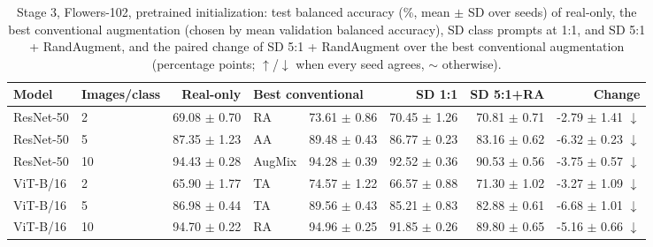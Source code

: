\begin{table}[H]
\centering
\small
\setlength{\tabcolsep}{4pt}
\caption{Stage 3, Flowers-102, pretrained initialization: test balanced accuracy (\%, mean $\pm$ SD over seeds) of real-only, the best conventional augmentation (chosen by mean validation balanced accuracy), SD class prompts at 1:1, and SD 5:1 + RandAugment, and the paired change of SD 5:1 + RandAugment over the best conventional augmentation (percentage points; $\uparrow$/$\downarrow$ when every seed agrees, $\sim$ otherwise).}
\label{tab:stage3-flowers102-scores-pretrained-test}
\begin{tabular}{llrlrrrr}
\toprule
Model & Images/class & Real-only & \multicolumn{2}{l}{Best conventional} & SD 1:1 & SD 5:1+RA & Change \\
\midrule
ResNet-50 & 2 & 69.08 $\pm$ 0.70 & RA & 73.61 $\pm$ 0.86 & 70.45 $\pm$ 1.26 & 70.81 $\pm$ 0.71 & -2.79 $\pm$ 1.41 $\downarrow$ \\
ResNet-50 & 5 & 87.35 $\pm$ 1.23 & AA & 89.48 $\pm$ 0.43 & 86.77 $\pm$ 0.23 & 83.16 $\pm$ 0.62 & -6.32 $\pm$ 0.23 $\downarrow$ \\
ResNet-50 & 10 & 94.43 $\pm$ 0.28 & AugMix & 94.28 $\pm$ 0.39 & 92.52 $\pm$ 0.36 & 90.53 $\pm$ 0.56 & -3.75 $\pm$ 0.57 $\downarrow$ \\
ViT-B/16 & 2 & 65.90 $\pm$ 1.77 & TA & 74.57 $\pm$ 1.22 & 66.57 $\pm$ 0.88 & 71.30 $\pm$ 1.02 & -3.27 $\pm$ 1.09 $\downarrow$ \\
ViT-B/16 & 5 & 86.98 $\pm$ 0.44 & TA & 89.56 $\pm$ 0.43 & 85.21 $\pm$ 0.83 & 82.88 $\pm$ 0.61 & -6.68 $\pm$ 1.01 $\downarrow$ \\
ViT-B/16 & 10 & 94.70 $\pm$ 0.22 & RA & 94.96 $\pm$ 0.25 & 91.85 $\pm$ 0.26 & 89.80 $\pm$ 0.65 & -5.16 $\pm$ 0.66 $\downarrow$ \\
\bottomrule
\end{tabular}
\end{table}
